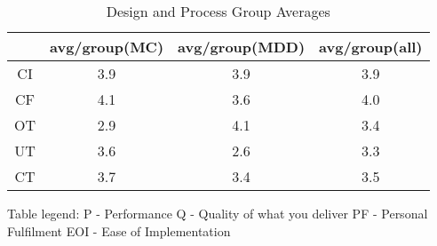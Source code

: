 \documentclass[final_report_innit.tex]{subfiles}
\begin{document}
\begin{table}[h]
\caption{Design and Process Group Averages}
\centering
\begin{tabular}{@{}c|c|c|c|@{}}
\cmidrule(l){2-4}
\multicolumn{1}{l|}{}    & \multicolumn{1}{l|}{avg/group(MC)} & \multicolumn{1}{l|}{avg/group(MDD)} & \multicolumn{1}{l|}{avg/group(all)} \\ \midrule
\multicolumn{1}{|c|}{CI} & 3.9                                & 3.9                                 & 3.9                                 \\ \midrule
\multicolumn{1}{|c|}{CF} & 4.1                                & 3.6                                 & 4.0                                 \\ \midrule
\multicolumn{1}{|c|}{OT} & 2.9                                & 4.1                                 & 3.4                                 \\ \midrule
\multicolumn{1}{|c|}{UT} & 3.6                                & 2.6                                 & 3.3                                 \\ \midrule
\multicolumn{1}{|c|}{CT} & 3.7                                & 3.4                                 & 3.5                                 \\ \bottomrule
\end{tabular}
\end{table}

Table legend:
P - Performance
Q - Quality of what you deliver
PF - Personal Fulfilment
EOI - Ease of Implementation
\end{document}
